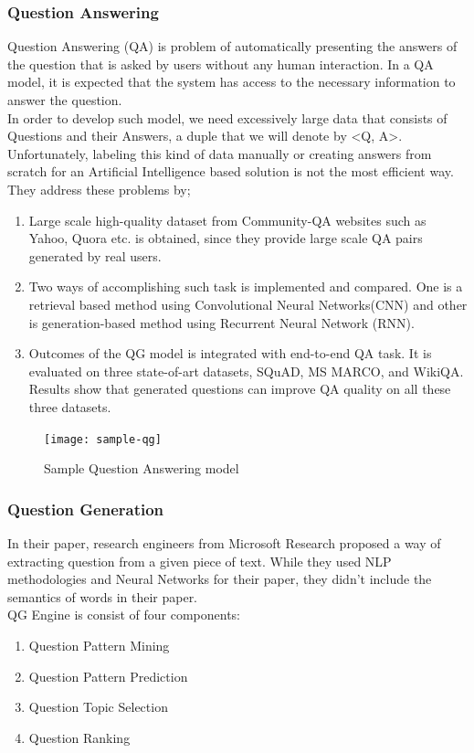 \documentclass{mefsdp}
\begin{document}
	\subsubsection{Question Answering}
	Question Answering (QA) is problem of automatically presenting the answers of the question that is asked by users without any human interaction. In a QA model, it is expected that the system has access to the necessary information to answer the question.\\
	In order to develop such model, we need excessively large data that consists of Questions and their Answers, a duple that we will denote by <Q, A>. Unfortunately, labeling this kind of data manually or creating answers from scratch for an Artificial Intelligence based solution is not the most efficient way.
	They address these problems by;
	\begin{enumerate}
		\item Large scale high-quality dataset from Community-QA websites such as Yahoo, Quora etc. is obtained, since they provide large scale QA pairs generated by real users.
		\item Two ways of accomplishing such task is implemented and compared. One is a retrieval based method using Convolutional Neural Networks(CNN) and other is generation-based method using Recurrent Neural Network (RNN).
		\item Outcomes of the QG model is integrated with end-to-end QA task. It is evaluated on three state-of-art datasets, SQuAD, MS MARCO, and WikiQA. Results show that generated questions can improve QA quality on all these three datasets.
	\end{enumerate}
	
	\begin{figure}[ht!]
		\centering
		\texttt{[image: sample-qg]}
		\caption{Sample Question Answering model}
	\end{figure}

	\subsubsection{Question Generation}
	In their paper, research engineers from Microsoft Research proposed a way of extracting question from a given piece of text. \cite{duan2017question} While they used NLP methodologies and Neural Networks for their paper, they didn’t include the semantics of words in their paper.\\
	
	QG Engine is consist of four components:
	\begin{enumerate}
		\item Question Pattern Mining
		\item Question Pattern Prediction
		\item Question Topic Selection
		\item Question Ranking
	\end{enumerate}
\end{document}
